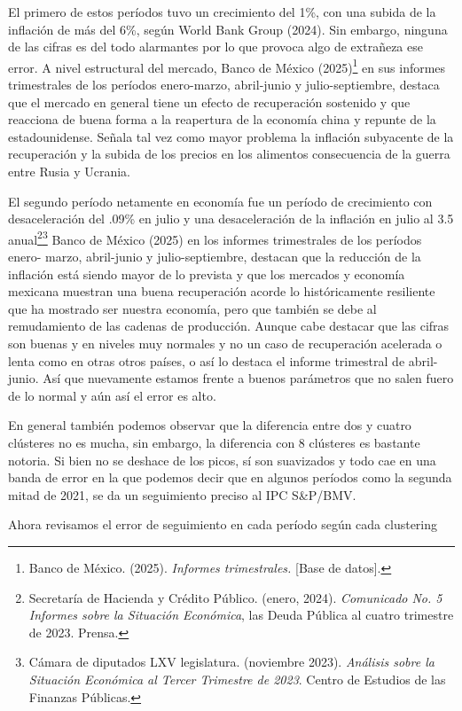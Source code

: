 \documentclass[
]{article}
\begin{document}
El primero de estos períodos tuvo un crecimiento del 1\%, con una subida de la inflación
de más del 6\%, según World Bank Group (2024). Sin embargo, ninguna de las cifras es
del todo alarmantes por lo que provoca algo de extrañeza ese error. A nivel estructural
del mercado, Banco de México (2025)\footnote{Banco de México. (2025). \emph{Informes trimestrales.}
{[}Base de datos{]}.} en sus informes trimestrales de los períodos enero-marzo, abril-junio
y julio-septiembre, destaca que el mercado en general tiene un efecto de recuperación
sostenido y que reacciona de buena forma a la reapertura de la economía china y
repunte de la estadounidense. Señala tal vez como mayor problema la inflación
subyacente de la recuperación y la subida de los precios en los alimentos
consecuencia de la guerra entre Rusia y Ucrania.

El segundo período netamente en economía fue un período de crecimiento con
desaceleración del .09\% en julio y una desaceleración de la inflación en julio al 3.5%
anual\footnote{Secretaría de Hacienda y Crédito Público. (enero, 2024). \emph{Comunicado No. 5
Informes sobre la Situación Económica}, las Deuda Pública al cuatro trimestre de 2023.
Prensa.}\footnote{Cámara de diputados LXV legislatura. (noviembre 2023). \emph{Análisis sobre la
Situación Económica al Tercer Trimestre de 2023}. Centro de Estudios de las Finanzas
Públicas.} Banco de México (2025) en los informes trimestrales de los períodos enero-
marzo, abril-junio y julio-septiembre, destacan que la reducción de la inflación está
siendo mayor de lo prevista y que los mercados y economía mexicana muestran una
buena recuperación acorde lo históricamente resiliente que ha mostrado ser nuestra
economía, pero que también se debe al remudamiento de las cadenas de producción.
Aunque cabe destacar que las cifras son buenas y en niveles muy normales y no un
caso de recuperación acelerada o lenta como en otras otros países, o así lo destaca el
informe trimestral de abril-junio. Así que nuevamente estamos frente a buenos
parámetros que no salen fuero de lo normal y aún así el error es alto.

En general también podemos observar que la diferencia entre dos y cuatro clústeres
no es mucha, sin embargo, la diferencia con 8 clústeres es bastante notoria. Si bien no
se deshace de los picos, sí son suavizados y todo cae en una banda de error en la que
podemos decir que en algunos períodos como la segunda mitad de 2021, se da un
seguimiento preciso al IPC S\&P/BMV.

Ahora revisamos el error de seguimiento en cada período según cada clustering
\end{document}
